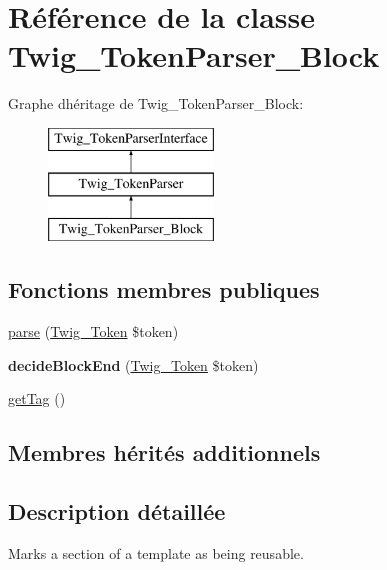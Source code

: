 \hypertarget{class_twig___token_parser___block}{}\section{Référence de la classe Twig\+\_\+\+Token\+Parser\+\_\+\+Block}
\label{class_twig___token_parser___block}
Graphe d\textquotesingle{}héritage de Twig\+\_\+\+Token\+Parser\+\_\+\+Block\+:\begin{figure}[H]
\begin{center}
\leavevmode
\includegraphics[height=3.000000cm]{class_twig___token_parser___block}
\end{center}
\end{figure}
\subsection*{Fonctions membres publiques}
\begin{DoxyCompactItemize}
\item 
\hyperlink{class_twig___token_parser___block_a5dfa2e269321584fb74e8b43dabe0efd}{parse} (\hyperlink{class_twig___token}{Twig\+\_\+\+Token} \$token)
\item 
{\bfseries decide\+Block\+End} (\hyperlink{class_twig___token}{Twig\+\_\+\+Token} \$token)\hypertarget{class_twig___token_parser___block_aa976dc013d35c2813752149bacd88902}{}\label{class_twig___token_parser___block_aa976dc013d35c2813752149bacd88902}

\item 
\hyperlink{class_twig___token_parser___block_ab86ba36154b20e6bbfa3ba705f12f9d6}{get\+Tag} ()
\end{DoxyCompactItemize}
\subsection*{Membres hérités additionnels}


\subsection{Description détaillée}
Marks a section of a template as being reusable.


